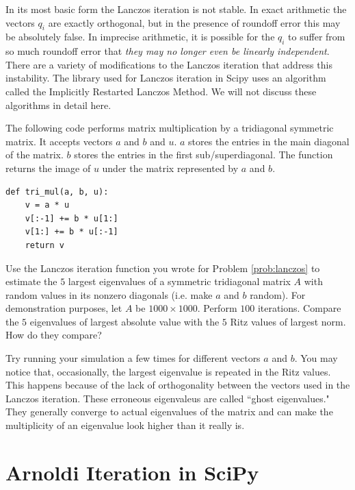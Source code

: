 In its most basic form the Lanczos iteration is not stable.
In exact arithmetic the vectors $q_i$ are exactly orthogonal, but in the presence of roundoff error this may be absolutely false.
In imprecise arithmetic, it is possible for the $q_i$ to suffer from so much roundoff error that \textit{they may no longer even be linearly independent}.
There are a variety of modifications to the Lanczos iteration that address this instability.
The library used for Lanczos iteration in Scipy uses an algorithm called the Implicitly Restarted Lanczos Method.
We will not discuss these algorithms in detail here.


\begin{problem}
The following code performs matrix multiplication by a tridiagonal symmetric matrix.
It accepts vectors $a$ and $b$ and $u$.
$a$ stores the entries in the main diagonal of the matrix.
$b$ stores the entries in the first sub/superdiagonal.
The function returns the image of $u$ under the matrix represented by $a$ and $b$.

\begin{lstlisting}
def tri_mul(a, b, u):
    v = a * u
    v[:-1] += b * u[1:]
    v[1:] += b * u[:-1]
    return v
\end{lstlisting}

Use the Lanczos iteration function you wrote for Problem \ref{prob:lanczos} to estimate the $5$ largest eigenvalues of a symmetric tridiagonal matrix $A$ with random values in its nonzero diagonals (i.e. make $a$ and $b$ random).
For demonstration purposes, let $A$ be $1000 \times 1000$.
Perform $100$ iterations.
Compare the $5$ eigenvalues of largest absolute value with the $5$ Ritz values of largest norm.
How do they compare?

Try running your simulation a few times for different vectors $a$ and $b$.
You may notice that, occasionally, the largest eigenvalue is repeated in the Ritz values.
This happens because of the lack of orthogonality between the vectors used in the Lanczos iteration.
These erroneous eigenvaleus are called ``ghost eigenvalues."
They generally converge to actual eigenvalues of the matrix and can make the multiplicity of an eigenvalue look higher than it really is.
\end{problem}

\section*{Arnoldi Iteration in SciPy}

